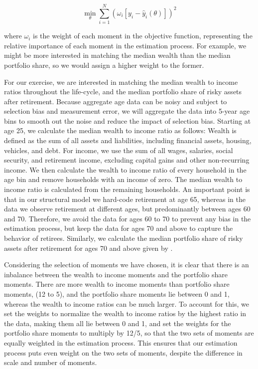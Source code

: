 \documentclass{article}
\begin{document}
\begin{equation}
\min_{\theta} \sum_{i=1}^{N}  \left( \omega_i [y_i - \hat{y}_i(\theta) ] \right)^2
\end{equation}

where $\omega_i$ is the weight of each moment in the objective function, representing the relative importance of each moment in the estimation process. For example, we might be more interested in matching the median wealth than the median portfolio share, so we would assign a higher weight to the former.

For our exercise, we are interested in matching the median wealth to income ratios throughout the life-cycle, and the median portfolio share of risky assets after retirement. Because aggregate age data can be noisy and subject to selection bias and measurement error, we will aggregate the data into 5-year age bins to smooth out the noise and reduce the impact of selection bias. Starting at age 25, we calculate the median wealth to income ratio as follows: Wealth is defined as the sum of all assets and liabilities, including financial assets, housing, vehicles, and debt. For income, we use the sum of all wages, salaries, social security, and retirement income, excluding capital gains and other non-recurring income. We then calculate the wealth to income ratio of every household in the age bin and remove households with an income of zero. The median wealth to income ratio is calculated from the remaining households. An important point is that in our structural model we hard-code retirement at age 65, whereas in the data we observe retirement at different ages, but predominantly between ages 60 and 70. Therefore, we avoid the data for ages 60 to 70 to prevent any bias in the estimation process, but keep the data for ages 70 and above to capture the behavior of retirees. Similarly, we calculate the median portfolio share of risky assets after retirement for ages 70 and above given by \cite{Aboagye2024}.

Considering the selection of moments we have chosen, it is clear that there is an inbalance between the wealth to income moments and the portfolio share moments. There are more wealth to income moments than portfolio share moments, (12 to 5), and the portfolio share moments lie between 0 and 1, whereas the wealth to income ratios can be much larger. To account for this, we set the weights to normalize the wealth to income ratios by the highest ratio in the data, making them all lie between 0 and 1, and set the weights for the portfolio share moments to multiply by 12/5, so that the two sets of moments are equally weighted in the estimation process. This ensures that our estimation process puts even weight on the two sets of moments, despite the difference in scale and number of moments.
\end{document}
